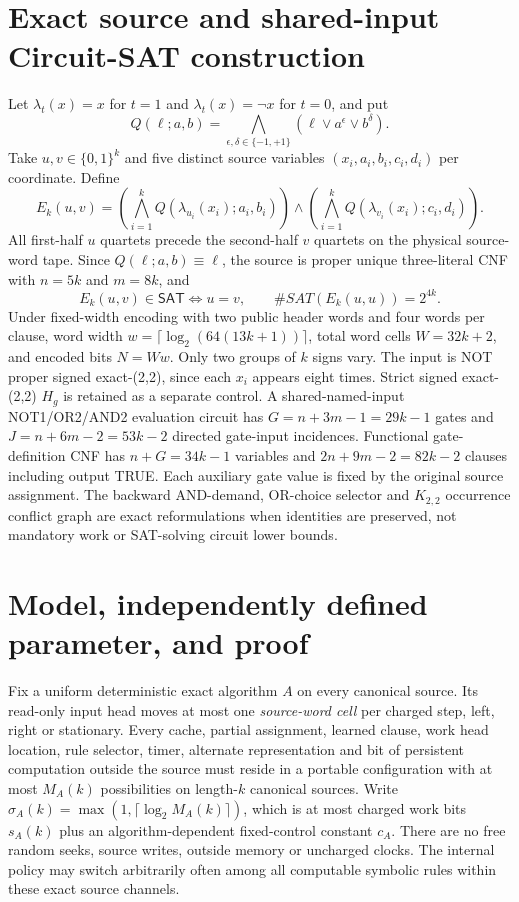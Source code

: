 \documentclass[11pt]{article}
\begin{document}
\section{Exact source and shared-input Circuit-SAT construction}
Let $\lambda_t(x)=x$ for $t=1$ and $\lambda_t(x)=\neg x$ for $t=0$, and put
\[
Q(\ell;a,b)=\bigwedge_{\epsilon,\delta\in\{-1,+1\}}
 (\ell\vee a^\epsilon\vee b^\delta).
\]
Take $u,v\in\{0,1\}^k$ and five distinct source variables $(x_i,a_i,b_i,c_i,d_i)$ per coordinate. Define
\[
E_k(u,v)=
\left(\bigwedge_{i=1}^k Q(\lambda_{u_i}(x_i);a_i,b_i)\right)
\land
\left(\bigwedge_{i=1}^k Q(\lambda_{v_i}(x_i);c_i,d_i)\right).
\]
All first-half $u$ quartets precede the second-half $v$ quartets on the physical source-word tape.
Since $Q(\ell;a,b)\equiv\ell$, the source is proper unique three-literal CNF with $n=5k$ and $m=8k$, and
\[
\boxed{E_k(u,v)\in\mathsf{SAT}\iff u=v},\qquad
\#SAT(E_k(u,u))=2^{4k}.
\]
Under fixed-width encoding with two public header words and four words per clause, word width
$w=\lceil\log_2(64(13k+1))\rceil$, total word cells $W=32k+2$, and encoded bits $N=Ww$.
Only two groups of $k$ signs vary. The input is NOT proper signed exact-(2,2), since each $x_i$ appears eight times. Strict signed exact-(2,2) $H_g$ is retained as a separate control.
A shared-named-input NOT1/OR2/AND2 evaluation circuit has $G=n+3m-1=29k-1$ gates and
$J=n+6m-2=53k-2$ directed gate-input incidences. Functional gate-definition CNF has $n+G=34k-1$ variables and $2n+9m-2=82k-2$ clauses including output TRUE. Each auxiliary gate value is fixed by the original source assignment. The backward AND-demand, OR-choice selector and $K_{2,2}$ occurrence conflict graph are exact reformulations when identities are preserved, not mandatory work or SAT-solving circuit lower bounds.

\section{Model, independently defined parameter, and proof}
Fix a uniform deterministic exact algorithm $A$ on every canonical source. Its read-only input head moves at most one \emph{source-word cell} per charged step, left, right or stationary. Every cache, partial assignment, learned clause, work head location, rule selector, timer, alternate representation and bit of persistent computation outside the source must reside in a portable configuration with at most
$M_A(k)$ possibilities on length-$k$ canonical sources. Write
$\sigma_A(k)=\max(1,\lceil\log_2 M_A(k)\rceil)$, which is at most charged work bits $s_A(k)$ plus an algorithm-dependent fixed-control constant $c_A$. There are no free random seeks, source writes, outside memory or uncharged clocks. The internal policy may switch arbitrarily often among all computable symbolic rules within these exact source channels.
\end{document}

